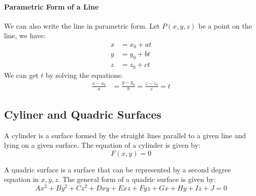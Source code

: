 \documentclass[11pt]{report}
\begin{document}
    \paragraph{Parametric Form of a Line} We can also write the line in parametric form. Let $P(x, y, z)$ be a point on the line, we have:
    \begin{align}
        x &= x_0 + at \\
        y &= y_0 + bt \\
        z &= z_0 + ct
    \end{align}
    We can get $t$ by solving the equations:
    \begin{align}
        \frac{x-x_0}{a} &= \frac{y-y_0}{b} = \frac{z-z_0}{c} = t
    \end{align}
\subsection{Cyliner and Quadric Surfaces}
\begin{definition}[Cylinder]
    A cylinder is a surface formed by the straight lines parallel to a given line and lying on a given surface. The equation of a cylinder is given by:
    \begin{equation}
        F(x, y) = 0
    \end{equation}
\end{definition}
\begin{definition}
    A quadric surface is a surface that can be represented by a second degree equation in $x, y, z$. The general form of a quadric surface is given by:
    \begin{equation}
        Ax^2 + By^2 + Cz^2 + Dxy + Exz + Fyz + Gx + Hy + Iz + J = 0
    \end{equation}
\end{definition}
\end{document}
